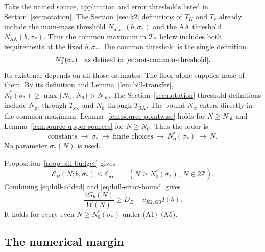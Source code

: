 Take the named source, application and error thresholds listed in
Section~\ref{sec:notation}. The Section~\ref{sec:k2} definitions of
\(T_K\) and \(T_r\) already include the main-mass threshold
\(N_{\mathrm{mass}}(b,\sigma_*)\) and the AA threshold
\(N_{\mathrm{AA}}(b,\sigma_*)\). Thus the common maximum in \(\mathcal T_*\)
below includes both requirements at the fixed \(b,\sigma_*\).
The common threshold is the single definition
\begin{equation}\label{eq:bill-threshold}
 N_0^*(\sigma_*)\quad\text{as defined in \eqref{eq:not-common-threshold}}.
\end{equation}
Its existence depends on all those estimates. The floor alone supplies
none of them. By its definition and Lemma~\ref{lem:bill-transfer},
$N_0^*(\sigma_*)\ge\max\{N_{\mathrm{tr}},N_6\}>N_{\mathrm{pt}}$.
The Section~\ref{sec:notation} threshold definitions include $N_{\mathrm{pt}}$ through
$T_{\mathrm{src}}$ and $N_6$ through $T_{\mathrm{RA}}$. The bound $N_{\mathrm{tr}}$
enters directly in the common maximum. Lemma~\ref{lem:source-pointwise}
holds for $N\ge N_{\mathrm{pt}}$ and Lemma~\ref{lem:source-upper-sources}
for $N\ge N_6$.
Thus the order is
\begin{equation}\label{eq:bill-order}
 \text{constants}\ \longrightarrow\ \sigma_*
 \ \longrightarrow\ \text{finite choices}
 \ \longrightarrow\ N_0^*(\sigma_*)\ \longrightarrow\ N.
\end{equation}
No parameter $\sigma_*(N)$ is used.

Proposition~\ref{prop:bill-budget} gives
\begin{equation}\label{eq:bill-error-bound}
 \mathcal E_B(N;b,\sigma_*)\le\delta_{\mathrm{err}}
 \qquad(N\ge N_0^*(\sigma_*),\ N\in2\mathbb Z).
\end{equation}
Combining \eqref{eq:bill-added} and \eqref{eq:bill-error-bound} gives
\begin{equation}\label{eq:bill-positive-count}
 \boxed{\displaystyle
 \frac{4G_b(N)}{W(N)}\ge D_B-c_{K2,G0}I(b).}
\end{equation}
It holds for every even $N\ge N_0^*(\sigma_*)$ under
\textup{(A1)}--\textup{(A5)}.

\subsection{The numerical margin}

